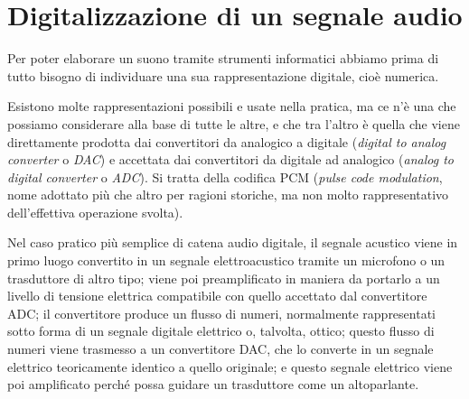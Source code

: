 
\chapter{Digitalizzazione di un segnale audio}

Per poter elaborare un suono tramite strumenti informatici abbiamo prima di tutto bisogno di individuare una sua rappresentazione digitale, cioè numerica.

Esistono molte rappresentazioni possibili e usate nella pratica, ma ce n'è una che possiamo considerare alla base di tutte le altre, e che tra l'altro è quella che viene direttamente prodotta dai convertitori da analogico a digitale (\emph{digital to analog converter} o \emph{DAC}) e accettata dai convertitori da digitale ad analogico (\emph{analog to digital converter} o \emph{ADC}). Si tratta della codifica PCM (\emph{pulse code modulation}, nome adottato più che altro per ragioni storiche, ma non molto rappresentativo dell'effettiva operazione svolta).

Nel caso pratico più semplice di catena audio digitale, il segnale acustico viene in primo luogo convertito in un segnale elettroacustico tramite un microfono o un trasduttore di altro tipo; viene poi preamplificato in maniera da portarlo a un livello di tensione elettrica compatibile con quello accettato dal convertitore ADC; il convertitore produce un flusso di numeri, normalmente rappresentati sotto forma di un segnale digitale elettrico o, talvolta, ottico; questo flusso di numeri viene trasmesso a un convertitore DAC, che lo converte in un segnale elettrico teoricamente identico a quello originale; e questo segnale elettrico viene poi amplificato perché possa guidare un trasduttore come un altoparlante.